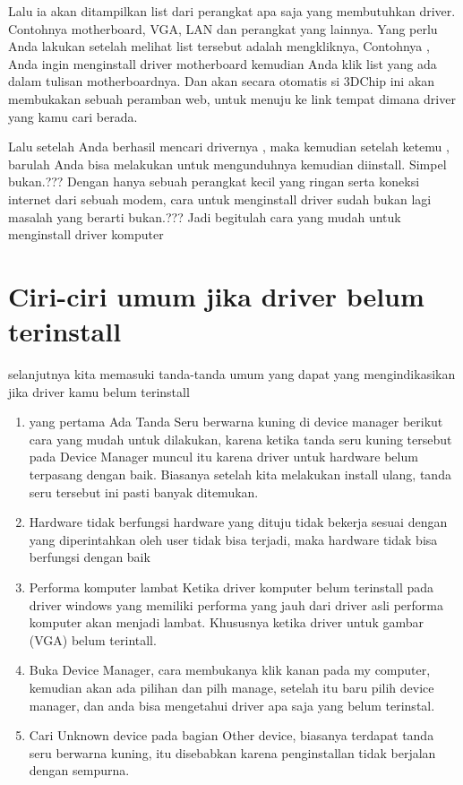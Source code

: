 Lalu ia akan ditampilkan list dari perangkat apa saja yang membutuhkan driver. Contohnya motherboard, VGA, LAN dan perangkat yang lainnya. Yang perlu Anda lakukan setelah melihat list tersebut adalah mengkliknya, Contohnya , Anda ingin menginstall driver motherboard kemudian Anda klik  list yang ada  dalam tulisan motherboardnya. Dan akan secara otomatis si 3DChip ini akan membukakan sebuah peramban web, untuk menuju ke link tempat dimana driver yang kamu cari berada.

Lalu setelah Anda berhasil mencari drivernya , maka kemudian setelah ketemu , barulah Anda bisa melakukan untuk  mengunduhnya kemudian diinstall. Simpel bukan.??? Dengan hanya sebuah perangkat kecil yang ringan serta koneksi internet dari sebuah modem, cara untuk menginstall driver sudah bukan lagi masalah yang berarti bukan.??? Jadi begitulah  cara yang mudah untuk  menginstall driver komputer 




\section{Ciri-ciri umum jika driver belum terinstall}
selanjutnya kita memasuki tanda-tanda umum yang dapat yang mengindikasikan jika driver kamu belum terinstall
\begin{enumerate}
\item yang pertama Ada Tanda Seru berwarna kuning di device manager
berikut  cara yang mudah untuk dilakukan, karena ketika tanda seru kuning  tersebut pada Device Manager muncul itu karena driver untuk hardware belum terpasang dengan baik. Biasanya setelah kita melakukan install ulang, tanda seru tersebut ini pasti banyak ditemukan. 
\item Hardware tidak berfungsi
 hardware yang dituju tidak  bekerja sesuai dengan yang diperintahkan oleh user tidak bisa terjadi, maka hardware tidak bisa berfungsi dengan baik
\item Performa komputer lambat
Ketika driver komputer belum terinstall pada driver windows yang memiliki performa yang jauh dari driver asli performa komputer akan menjadi lambat. Khususnya ketika driver untuk gambar (VGA) belum terintall. 
\item Buka Device Manager, cara membukanya klik kanan pada my computer, kemudian akan ada pilihan dan pilh manage, setelah itu baru pilih device manager, dan anda bisa mengetahui driver apa saja yang belum terinstal.
\item Cari Unknown device pada bagian Other device, biasanya terdapat tanda seru berwarna kuning, itu disebabkan karena penginstallan tidak berjalan dengan sempurna.
\end{enumerate}
